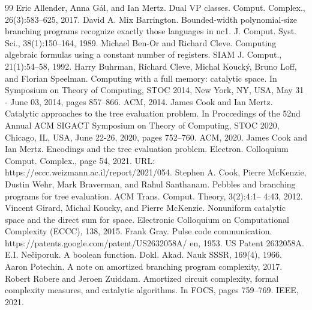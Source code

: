 \begin{thebibliography}{99}
 Eric Allender, Anna Gál, and Ian Mertz. Dual VP classes. Comput. Complex., 26(3):583–625, 2017.
 David A. Mix Barrington. Bounded-width polynomial-size branching programs recognize exactly those languages in nc1. J. Comput. Syst. Sci., 38(1):150–164, 1989.
 Michael Ben-Or and Richard Cleve. Computing algebraic formulas using a constant number of registers. SIAM J. Comput., 21(1):54–58, 1992.
 Harry Buhrman, Richard Cleve, Michal Koucký, Bruno Loff, and Florian Speelman. Computing with a full memory: catalytic space. In Symposium on Theory of Computing, STOC 2014, New York, NY, USA, May 31 - June 03, 2014, pages 857–866. ACM, 2014.
 James Cook and Ian Mertz. Catalytic approaches to the tree evaluation problem. In Proccedings of the 52nd Annual ACM SIGACT Symposium on Theory of Computing, STOC 2020, Chicago, IL, USA, June 22-26, 2020, pages 752–760. ACM, 2020.
 James Cook and Ian Mertz. Encodings and the tree evaluation problem. Electron. Colloquium Comput. Complex., page 54, 2021. URL: https://eccc.weizmann.ac.il/report/2021/054.
 Stephen A. Cook, Pierre McKenzie, Dustin Wehr, Mark Braverman, and Rahul Santhanam. Pebbles and branching programs for tree evaluation. ACM Trans. Comput. Theory, 3(2):4:1– 4:43, 2012.
 Vincent Girard, Michal Koucky, and Pierre McKenzie. Nonuniform catalytic space and the direct sum for space. Electronic Colloquium on Computational Complexity (ECCC), 138, 2015.
 Frank Gray. Pulse code communication. https://patents.google.com/patent/US2632058A/ en, 1953. US Patent 2632058A.
 E.I. Nečiporuk. A boolean function. Dokl. Akad. Nauk SSSR, 169(4), 1966.
 Aaron Potechin. A note on amortized branching program complexity, 2017.
 Robert Robere and Jeroen Zuiddam. Amortized circuit complexity, formal complexity measures, and catalytic algorithms. In FOCS, pages 759–769. IEEE, 2021.
\end{thebibliography}
